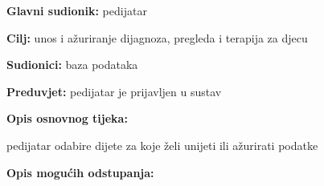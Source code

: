                     \noindent {}
					\begin{packed_item}
	
						\item \textbf{Glavni sudionik: }pedijatar
						\item  \textbf{Cilj:} unos i ažuriranje dijagnoza, pregleda i terapija za djecu
						\item  \textbf{Sudionici:} baza podataka
						\item  \textbf{Preduvjet:} pedijatar je prijavljen u sustav
						\item  \textbf{Opis osnovnog tijeka:}
						
						\item[] \begin{packed_enum}
	
							\item pedijatar odabire dijete za koje želi unijeti ili ažurirati podatke
							\item 
							\item 

						\end{packed_enum}
						
						\item  \textbf{Opis mogućih odstupanja:}
						
						\item[] \begin{packed_item}
	
							\item[2.a] 
							\item[] \begin{packed_enum}
								
								\item 
								\item 
							\end{packed_enum}
							
						\end{packed_item}
					\end{packed_item}

